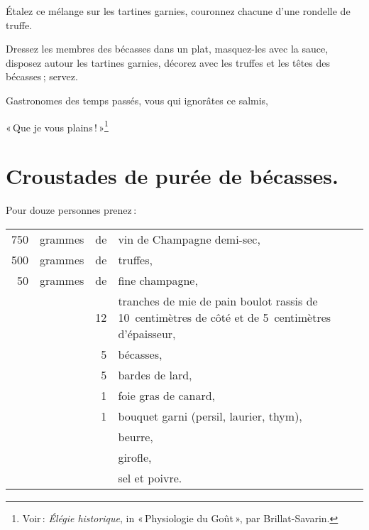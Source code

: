 Étalez ce mélange sur les tartines garnies, couronnez chacune d'une rondelle de
truffe.

Dressez les membres des bécasses dans un plat, masquez-les avec la sauce,
disposez autour les tartines garnies, décorez avec les truffes et les têtes des
bécasses ; servez.

\begin{center}
\small
Gastronomes des temps passés, vous qui ignorâtes ce salmis,

« Que je vous plains ! »\footnote{Voir : \textit{Élégie historique}, in
« Physiologie du Goût », par Brillat-Savarin.}

\end{center}

\section*{\centering Croustades de purée de bécasses.}
{}
\label{pg0634} \hypertarget{p0634}{}

Pour douze personnes prenez :

\footnotesize
\begin{longtable}{rrrp{16em}}
    750 & grammes & de & vin de Champagne demi-sec,                                                       \\
    500 & grammes & de & truffes,                                                                         \\
     50 & grammes & de & fine champagne,                                                                  \\
        &         & 12 & tranches de mie de pain boulot rassis de 10 cen\-timè\-tres
                         de côté et de 5 cen\-timè\-tres d'épai\-sseur,                                   \\
        &         &  5 & bécasses,                                                                        \\
        &         &  5 & bardes de lard,                                                                  \\
        &         &  1 & foie gras de canard,                                                             \\
        &         &  1 & bouquet garni (persil, laurier, thym),                                           \\
        &         &    & beurre,                                                                          \\
        &         &    & girofle,                                                                         \\
        &         &    & sel et poivre.                                                                   \\
\end{longtable}
\normalsize

